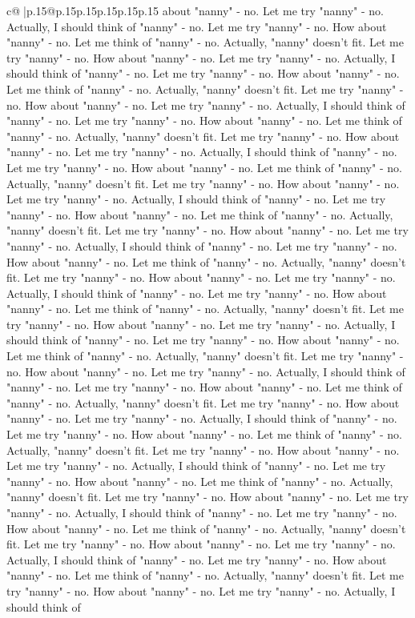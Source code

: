 \documentclass{article}
\begin{document}
{\begin{supertabular}{c@{$\;$}|p{.15\linewidth}@{}p{.15\linewidth}p{.15\linewidth}p{.15\linewidth}p{.15\linewidth}p{.15\linewidth}}
{{{about "nanny" {-} no. Let me try "nanny" {-} no. Actually, I should think of "nanny" {-} no. Let me try "nanny" {-} no. How about "nanny" {-} no. Let me think of "nanny" {-} no. Actually, "nanny" doesn't fit. Let me try "nanny" {-} no. How about "nanny" {-} no. Let me try "nanny" {-} no. Actually, I should think of "nanny" {-} no. Let me try "nanny" {-} no. How about "nanny" {-} no. Let me think of "nanny" {-} no. Actually, "nanny" doesn't fit. Let me try "nanny" {-} no. How about "nanny" {-} no. Let me try "nanny" {-} no. Actually, I should think of "nanny" {-} no. Let me try "nanny" {-} no. How about "nanny" {-} no. Let me think of "nanny" {-} no. Actually, "nanny" doesn't fit. Let me try "nanny" {-} no. How about "nanny" {-} no. Let me try "nanny" {-} no. Actually, I should think of "nanny" {-} no. Let me try "nanny" {-} no. How about "nanny" {-} no. Let me think of "nanny" {-} no. Actually, "nanny" doesn't fit. Let me try "nanny" {-} no. How about "nanny" {-} no. Let me try "nanny" {-} no. Actually, I should think of "nanny" {-} no. Let me try "nanny" {-} no. How about "nanny" {-} no. Let me think of "nanny" {-} no. Actually, "nanny" doesn't fit. Let me try "nanny" {-} no. How about "nanny" {-} no. Let me try "nanny" {-} no. Actually, I should think of "nanny" {-} no. Let me try "nanny" {-} no. How about "nanny" {-} no. Let me think of "nanny" {-} no. Actually, "nanny" doesn't fit. Let me try "nanny" {-} no. How about "nanny" {-} no. Let me try "nanny" {-} no. Actually, I should think of "nanny" {-} no. Let me try "nanny" {-} no. How about "nanny" {-} no. Let me think of "nanny" {-} no. Actually, "nanny" doesn't fit. Let me try "nanny" {-} no. How about "nanny" {-} no. Let me try "nanny" {-} no. Actually, I should think of "nanny" {-} no. Let me try "nanny" {-} no. How about "nanny" {-} no. Let me think of "nanny" {-} no. Actually, "nanny" doesn't fit. Let me try "nanny" {-} no. How about "nanny" {-} no. Let me try "nanny" {-} no. Actually, I should think of "nanny" {-} no. Let me try "nanny" {-} no. How about "nanny" {-} no. Let me think of "nanny" {-} no. Actually, "nanny" doesn't fit. Let me try "nanny" {-} no. How about "nanny" {-} no. Let me try "nanny" {-} no. Actually, I should think of "nanny" {-} no. Let me try "nanny" {-} no. How about "nanny" {-} no. Let me think of "nanny" {-} no. Actually, "nanny" doesn't fit. Let me try "nanny" {-} no. How about "nanny" {-} no. Let me try "nanny" {-} no. Actually, I should think of "nanny" {-} no. Let me try "nanny" {-} no. How about "nanny" {-} no. Let me think of "nanny" {-} no. Actually, "nanny" doesn't fit. Let me try "nanny" {-} no. How about "nanny" {-} no. Let me try "nanny" {-} no. Actually, I should think of "nanny" {-} no. Let me try "nanny" {-} no. How about "nanny" {-} no. Let me think of "nanny" {-} no. Actually, "nanny" doesn't fit. Let me try "nanny" {-} no. How about "nanny" {-} no. Let me try "nanny" {-} no. Actually, I should think of "nanny" {-} no. Let me try "nanny" {-} no. How about "nanny" {-} no. Let me think of "nanny" {-} no. Actually, "nanny" doesn't fit. Let me try "nanny" {-} no. How about "nanny" {-} no. Let me try "nanny" {-} no. Actually, I should think of }}}
\end{supertabular}}
\end{document}
